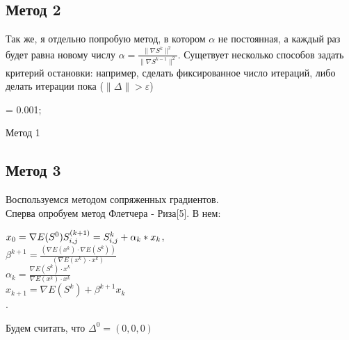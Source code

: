 \documentclass[ 12pt,x11names]{article}
\begin{document}
    \subsection{Метод 2}
    Так же, я  отдельно попробую метод, в котором  $\alpha$ не постоянная, а каждый раз будет равна новому числу
     $\alpha  = \frac{\| \nabla S^k \|^2}{\| \nabla S^{k-1} \|^2}$.
    Сущетвует несколько способов задать критерий остановки: например, сделать фиксированное число итераций, либо делать итерации пока  ($\| \Delta \|> \varepsilon$)\\
    \begin{algorithm}[H]
		\SetAlgoLined
		\alpha = 0.001;\\
	\caption{Метод 1}
    \end{algorithm}
    \subsection{Метод 3}
    Воспользуемся методом сопряженных градиентов.\\
    Сперва опробуем метод Флетчера - Риза[5]. В нем:
    \begin{center}
    $ x_0= \nabla E(S^0)\\
    S^{(k + 1)}_{i, j} = S^{k}_{i, j} + \alpha_k * x_k $,\\
     $\beta ^{k +1} = \frac{ (\nabla E(x^k) \cdot \nabla E(S^k))} { (\nabla E(x^k) \cdot x^k)}$\\
    $\alpha_k =\frac{\nabla E(S^k) \cdot x^k}{\nabla E(x^k) \cdot x^k}$\\
    $x_{k + 1}= \nabla E(S^k) + \beta ^ {k + 1} x_k$\\
   .
    \end{center}
    Будем считать, что $\Delta^0=(0,0,0)$\\
\end{document}
